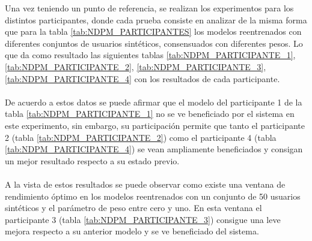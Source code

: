 Una vez teniendo un punto de referencia, se realizan los experimentos para los distintos participantes, donde cada prueba consiste en analizar de la misma forma que para la tabla \ref{tab:NDPM_PARTICIPANTES} los modelos reentrenados con diferentes conjuntos de usuarios sintéticos, consensuados con diferentes pesos. Lo que da como resultado las siguientes tablas \ref{tab:NDPM_PARTICIPANTE_1}, \ref{tab:NDPM_PARTICIPANTE_2}, \ref{tab:NDPM_PARTICIPANTE_3}, \ref{tab:NDPM_PARTICIPANTE_4} con los resultados de cada participante.
\\ \\
De acuerdo a estos datos se puede afirmar que el modelo del participante 1 de la tabla \ref{tab:NDPM_PARTICIPANTE_1} no se ve beneficiado por el sistema en este experimento, sin embargo, su participación permite que tanto el participante 2 (tabla \ref{tab:NDPM_PARTICIPANTE_2}) como el participante 4 (tabla \ref{tab:NDPM_PARTICIPANTE_4}) se vean ampliamente beneficiados y consigan un mejor resultado respecto a su estado previo.
\\ \\
A la vista de estos resultados se puede observar como existe una ventana de rendimiento óptimo en los modelos reentrenados con un conjunto de 50 usuarios sintéticos y el parámetro de peso entre cero y uno. En esta ventana el participante 3 (tabla \ref{tab:NDPM_PARTICIPANTE_3}) consigue una leve mejora respecto a su anterior modelo y se ve beneficiado del sistema. 
